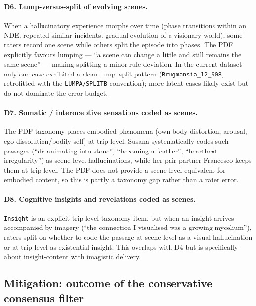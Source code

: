 \paragraph{D6. Lump-versus-split of evolving scenes.}
When a hallucinatory experience morphs over time (phase transitions within an NDE, repeated similar incidents, gradual evolution of a visionary world), some raters record one scene while others split the episode into phases. The PDF explicitly favours lumping --- ``a scene can change a little and still remains the same scene'' --- making splitting a minor rule deviation. In the current dataset only one case exhibited a clean lump--split pattern (\texttt{Brugmansia\_12\_S08}, retrofitted with the \texttt{LUMPA/SPLITB} convention); more latent cases likely exist but do not dominate the error budget.

\paragraph{D7. Somatic / interoceptive sensations coded as scenes.}
The PDF taxonomy places embodied phenomena (own-body distortion, arousal, ego-dissolution/bodily self) at trip-level. Susana systematically codes such passages (``de-animating into stone'', ``becoming a feather'', ``heartbeat irregularity'') as scene-level hallucinations, while her pair partner Francesco keeps them at trip-level. The PDF does not provide a scene-level equivalent for embodied content, so this is partly a taxonomy gap rather than a rater error.

\paragraph{D8. Cognitive insights and revelations coded as scenes.}
\texttt{Insight} is an explicit trip-level taxonomy item, but when an insight arrives accompanied by imagery (``the connection I visualised was a growing mycelium''), raters split on whether to code the passage at scene-level as a visual hallucination or at trip-level as existential insight. This overlaps with D4 but is specifically about insight-content with imagistic delivery.

\subsection{Mitigation: outcome of the conservative consensus filter}

